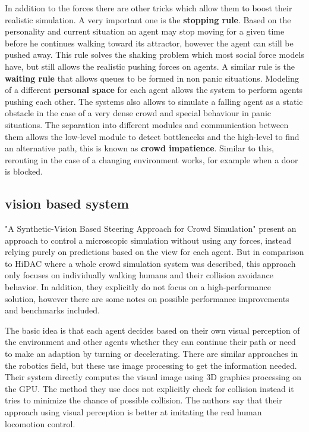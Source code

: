 \documentclass{acmsiggraph}               %
\begin{document}
In addition to the forces there are other tricks which allow them to boost their realistic simulation. 
A very important one is the \textbf{stopping rule}. Based on the personality and current situation an agent may stop moving for a given time before he continues walking toward its attractor, however the agent can still be pushed away. This rule solves the shaking problem which most social force models have, but still allows the realistic pushing forces on agents. 
A similar rule is the \textbf{waiting rule} that allows queues to be formed in non panic situations. Modeling of a different \textbf{personal space} for each agent allows the system to perform agents pushing each other. 
The systems also allows to simulate a falling agent as a static obstacle in the case of a very dense crowd and special behaviour in panic situations. 
The separation into different modules and communication between them allows the low-level module to detect bottlenecks and the high-level to find an alternative path, this is known as \textbf{crowd impatience}. Similar to this, rerouting in the case of a changing environment works, for example when a door is blocked.

\subsection{vision based system}

"A Synthetic-Vision Based Steering Approach for Crowd Simulation" \cite{ondrej_synthetic-vision_2010} present an approach to control a microscopic simulation without using any forces, instead relying purely on predictions based on the view for each agent.
But in comparison to HiDAC where a whole crowd simulation system was described, this approach only focuses on individually walking humans and their collision avoidance behavior. In addition, they explicitly do not focus on a high-performance solution, however there are some notes on possible performance improvements and benchmarks included. 

The basic idea is that each agent decides based on their own visual perception of the environment and other agents whether they can continue their path or need to make an adaption by turning or decelerating. There are similar approaches in the robotics field, but these use image processing to get the information needed. Their system directly computes the visual image using 3D graphics processing on the GPU.
The method they use does not explicitly check for collision instead it tries to minimize the chance of possible collision. The authors say that their approach using visual perception is better at imitating the real human locomotion control.
\end{document}
